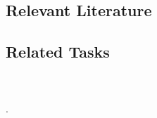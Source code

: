 \subsection{Relevant Literature}
\begin{refsection}
\nocite{test,alang2017police,clayton2018black}
\printbibliography[heading=none]
\end{refsection}
%
%
%
%
\subsection{Related Tasks}
\fourcOne{}\\
\fourdOne{}\\.
\fourdTwo{}\\
\fourdNineteen{}\\
\fourdTwentyOne{}\\
\foureFour{}\\
\fourfTwo{}\\
%
%
%
%
\section{\foureSix{}}
